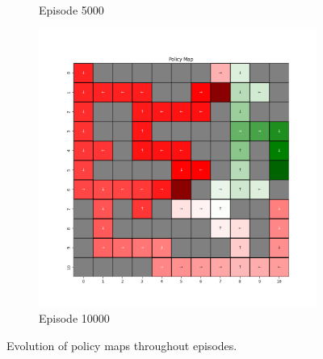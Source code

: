 \documentclass{assignment}
\begin{document}
\begin{figure}[H]
\begin{subfigure}{0.3\textwidth}
    \caption{Episode 5000}
    \end{subfigure}\hfill
    \begin{subfigure}{0.3\textwidth}
        \includegraphics[width=\textwidth]{figures/policy_q/epsilon_sweep/policy_alpha_0.1_gamma_0.95_epsilon_1.0_iteration_10000.png}
    \caption{Episode 10000}
    \end{subfigure}
    \caption{Evolution of policy maps throughout episodes.}
    \label{fig:epsilon_1.0_q_learning_policy}
\end{figure}
\end{document}
